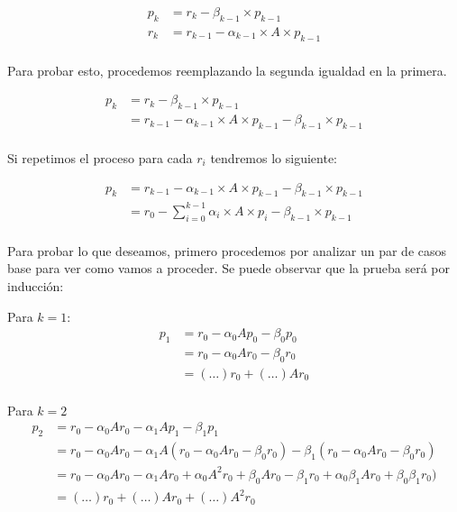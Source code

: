 \begin{itemize}
    \begin{align*}
        p_k &= r_k - \beta_{k-1} \times p_{k-1}\\
        r_k &= r_{k-1} - \alpha_{k-1} \times A \times p_{k-1}\\
    \end{align*}
    
    Para probar esto, procedemos reemplazando la segunda igualdad en la primera.
    
    \begin{align*}
        p_k &= r_k - \beta_{k-1} \times p_{k-1}\\
            &= r_{k-1} - \alpha_{k-1} \times A \times p_{k-1} - \beta_{k-1} \times p_{k-1}\\
    \end{align*}
    
    Si repetimos el proceso para cada $r_i$ tendremos lo siguiente:
    
    \begin{align*}
        p_k &= r_{k-1} - \alpha_{k-1} \times A \times p_{k-1} - \beta_{k-1} \times p_{k-1}\\
            &= r_0 - \sum_{i=0}^{k-1} \alpha_i \times A \times p_i - \beta_{k-1} \times p_{k-1}\\
    \end{align*}
    
    Para probar lo que deseamos, primero procedemos por analizar un par de casos base para ver como vamos a proceder. Se puede observar que la prueba será por inducción:
    
    \begin{description}
        \item Para $k=1$:
            \begin{align*}
                p_1 &= r_0 - \alpha_0 A p_0 - \beta_0 p_0\\
                    &= r_0 - \alpha_0 A r_0 - \beta_0 r_0\\
                    &= (\ldots) r_0 + (\ldots) A r_0\\
            \end{align*}
            
        \item Para $k=2$
            \begin{align*}
                p_2 &= r_0 - \alpha_0 A r_0 - \alpha_1 A p_1 - \beta_1 p_1\\
                    &= r_0 - \alpha_0 A r_0 - \alpha_1 A (r_0 - \alpha_0 A r_0 - \beta_0 r_0) - \beta_1 (r_0 - \alpha_0 A r_0 - \beta_0 r_0)\\
                    &= r_0 - \alpha_0 A r_0 - \alpha_1 A r_0 + \alpha_0 A^2 r_0 + \beta_0 A r_0 - \beta_1 r_0 + \alpha_0 \beta_1 A r_0 + \beta_0 \beta_1 r_0)\\
                    &= (\ldots) r_0 + (\ldots) A r_0 + (\ldots) A^2 r_0\\
            \end{align*}
    \end{description}
    

\end{itemize}
